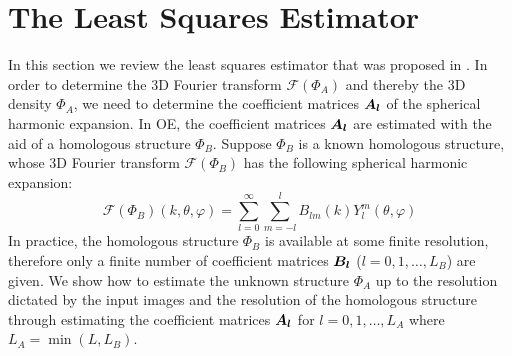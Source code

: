 \section{The Least Squares Estimator}
\label{sec:ls_est}
In this section we review the least squares estimator that was proposed in \cite{Bhamre2014}.
In order to determine the 3D Fourier transform $\mathcal{F}(\Phi_A)$ and thereby the 3D density  ${\Phi_A}$, we need to determine the coefficient matrices $\boldsymbol{A}_{\boldsymbol{l}}$ of the spherical harmonic expansion. In OE, the coefficient matrices $\boldsymbol{A}_{\boldsymbol{l}}$ are estimated with 
the aid of a homologous structure $\Phi_B$. Suppose $\Phi_B$ is a known 
homologous
structure, whose 3D Fourier transform $\mathcal{F}(\Phi_B)$ has the following 
spherical harmonic expansion:
\begin{equation}
\mathcal{F}(\Phi_B)(k,\theta,\varphi) = \sum_{l=0}^{\infty} \sum_{m=-l}^{l}
B_{lm}(k) Y_l^m (\theta, \varphi)
\end{equation} 
In practice, the homologous structure $\Phi_B$ is available at some finite resolution, therefore only a finite number of coefficient matrices $\boldsymbol{B}_{\boldsymbol{l}}$ ($l=0,1,\ldots,L_B$) are given. We show how to estimate the unknown structure $\Phi_A$ up to the resolution dictated by the input images and the resolution of the homologous structure through estimating the  coefficient matrices $\boldsymbol{A}_{\boldsymbol{l}}$ for $l=0,1,\ldots,L_A$ where $L_A = \min({L,L_B})$.


